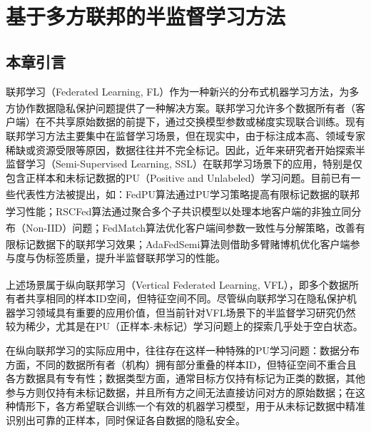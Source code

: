 \chapter{基于多方联邦的半监督学习方法} %

\thispagestyle{others} %

\pagestyle{others} %

\xiaosi %


\section{本章引言}
联邦学习（Federated Learning, FL）作为一种新兴的分布式机器学习方法，为多方协作数据隐私保护问题提供了一种解决方案\textsuperscript{\cite{mcmahan2017communication}}。联邦学习允许多个数据所有者（客户端）在不共享原始数据的前提下，通过交换模型参数或梯度实现联合训练。现有联邦学习方法主要集中在监督学习场景，但在现实中，由于标注成本高、领域专家稀缺或资源受限等原因，数据往往并不完全标记。因此，近年来研究者开始探索半监督学习（Semi-Supervised Learning, SSL）在联邦学习场景下的应用，特别是仅包含正样本和未标记数据的PU（Positive and Unlabeled）学习问题。目前已有一些代表性方法被提出，如：FedPU算法\textsuperscript{\cite{lin2022federated}}通过PU学习策略提高有限标记数据的联邦学习性能；RSCFed算法\textsuperscript{\cite{liang2022rscfed}}通过聚合多个子共识模型以处理本地客户端的非独立同分布（Non-IID）问题；FedMatch算法\textsuperscript{\cite{jeong2020federated}}优化客户端间参数一致性与分解策略，改善有限标记数据下的联邦学习效果；AdaFedSemi算法\textsuperscript{\cite{wang2022enhancing}}则借助多臂赌博机优化客户端参与度与伪标签质量，提升半监督联邦学习的性能。

上述场景属于纵向联邦学习（Vertical Federated Learning, VFL）\textsuperscript{\cite{yang2019federated}}，即多个数据所有者共享相同的样本ID空间，但特征空间不同。尽管纵向联邦学习在隐私保护机器学习领域具有重要的应用价值，但当前针对VFL场景下的半监督学习研究仍然较为稀少，尤其是在PU（正样本-未标记）学习问题上的探索几乎处于空白状态。

在纵向联邦学习的实际应用中，往往存在这样一种特殊的PU学习问题：数据分布方面，不同的数据所有者（机构）拥有部分重叠的样本ID，但特征空间不重合且各方数据具有专有性；数据类型方面，通常目标方仅持有标记为正类的数据，其他参与方则仅持有未标记数据，并且所有方之间无法直接访问对方的原始数据；在这种情形下，各方希望联合训练一个有效的机器学习模型，用于从未标记数据中精准识别出可靠的正样本，同时保证各自数据的隐私安全。

